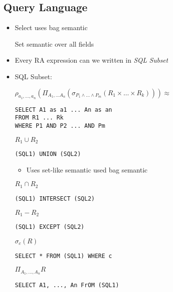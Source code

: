 \subsection{Query Language}
\begin{itemize}
        \begin{itemize}
             List of relation whose cross product is taken
             Selection condition
             Projection
        \end{itemize}
    \item Select uses bag semantic
        \begin{itemize}
             Set semantic over all fields
        \end{itemize}
    \item Every RA expression can we written in \textit{SQL Subset}
    \item{SQL Subset:}
        \begin{itemize}
             $\rho_{a_1, \dots , a_n}(\Pi_{A_1, \dots A_n}(\sigma_{P_1 \wedge \dots \wedge P_m}(R_1 \times \dots \times R_k))) \approx$
\begin{verbatim}
SELECT A1 as a1 ... An as an
FROM R1 ... Rk
WHERE P1 AND P2 ... AND Pm
\end{verbatim}
             $R_1 \cup R_2$
\begin{verbatim}
(SQL1) UNION (SQL2)
\end{verbatim}
                \begin{itemize}
                    \item Uses set-like semantic
                     used bag semantic
                \end{itemize}
             $R_1 \cap R_2$
\begin{verbatim}
(SQL1) INTERSECT (SQL2)
\end{verbatim}
             $R_1 - R_2$
\begin{verbatim}
(SQL1) EXCEPT (SQL2)
\end{verbatim}
             $\sigma_c(R)$
\begin{verbatim}
SELECT * FROM (SQL1) WHERE c
\end{verbatim}
             $\Pi_{A_1, \dots , A_n} R$
\begin{verbatim}
SELECT A1, ..., An FrOM (SQL1)
\end{verbatim}

\end{itemize}
\end{itemize}
